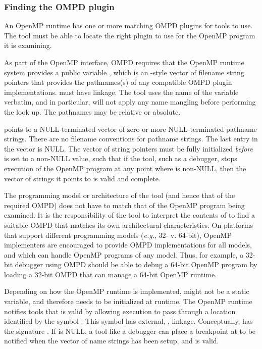 \subsubsection{Finding the OMPD plugin}
\label{sec:ompd:finding-the-ompd}

An OpenMP runtime has one or more matching OMPD plugins for 
tools to use.
The tool must be able to locate the right plugin to use
for the OpenMP program it is examining.

As part of the OpenMP interface, OMPD requires that the OpenMP
runtime system provides a public variable ,
which is an -style vector of filename string pointers that
provides the pathnames(s) of any compatible OMPD plugin implementations.
 must have  linkage.
The tool uses the name of the variable verbatim,
and in particular, will not apply any name mangling before
performing the look up.
The pathnames may be relative or absolute.

 points to a NULL-terminated
vector of zero or more NULL-terminated pathname strings.
There are no filename conventions for pathname strings.
The last entry in the vector is NULL.
The vector of string pointers must be fully initialized \emph{before}
 is set to a non-NULL value,
such that if the tool, such as a debugger,
stops execution of the OpenMP program at any point where
 is non-NULL,
then the vector of strings it points to is valid and complete.

The programming model or architecture of the tool (and hence
that of the required OMPD) does not have to match that of the OpenMP program
being examined.
It is the responsibility of the tool to interpret the contents
of  to find a suitable OMPD that matches
its own architectural characteristics.
On platforms that support different programming models
(\textit{e.g.}, 32- v. 64-bit), OpenMP implementers are encouraged
to provide OMPD implementations for all models, and which can handle
OpenMP programs of any model.
Thus, for example, a 32-bit debugger using OMPD should be able
to debug a 64-bit OpenMP program
by loading a 32-bit OMPD that can manage a 64-bit OpenMP runtime.

Depending on how the OpenMP runtime is implemented, 
might not be a static variable, and therefore needs to be initialized
at runtime.
The OpenMP runtime notifies tools that 
is valid by allowing execution to pass through a location identified
by the symbol .
This symbol has external, , linkage.
Conceptually,  has the signature
.
If  is NULL, a tool like a debugger
can place a breakpoint at  to be notified
when the vector of name strings has been setup, and is valid.

